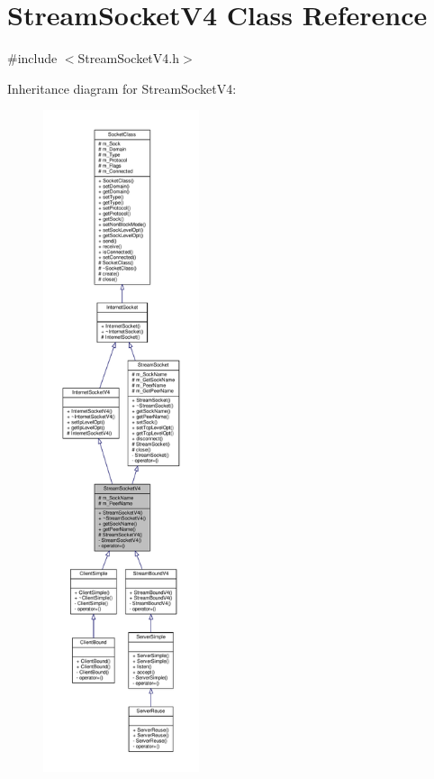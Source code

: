 \hypertarget{classStreamSocketV4}{}\section{Stream\+Socket\+V4 Class Reference}
\label{classStreamSocketV4}


{\ttfamily \#include $<$Stream\+Socket\+V4.\+h$>$}



Inheritance diagram for Stream\+Socket\+V4\+:\nopagebreak
\begin{figure}[H]
\begin{center}
\leavevmode
\includegraphics[height=550pt]{classStreamSocketV4__inherit__graph}
\end{center}
\end{figure}
